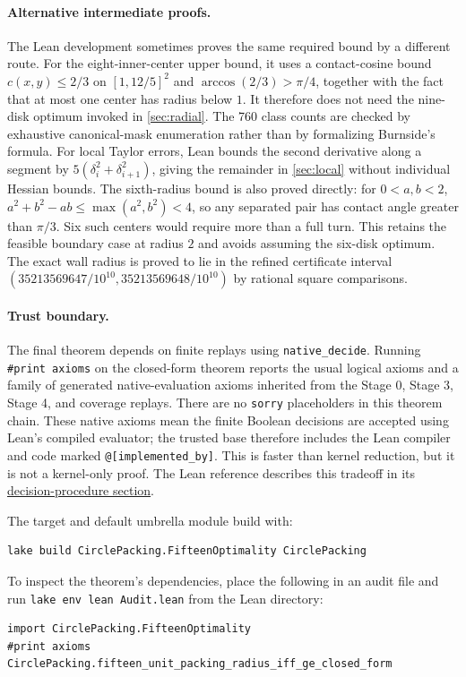 \documentclass[11pt]{article}
\theoremstyle{definition}
\begin{document}
\paragraph{Alternative intermediate proofs.}
The Lean development sometimes proves the same required bound by a different
route. For the eight-inner-center upper bound, it uses a contact-cosine bound
$c(x,y)\le2/3$ on $[1,12/5]^2$ and
$\arccos(2/3)>\pi/4$, together with the fact that at most one center has
radius below $1$. It therefore does not need the nine-disk optimum invoked
in \cref{sec:radial}. The 760 class counts are checked by exhaustive
canonical-mask enumeration rather than by formalizing Burnside's formula.
For local Taylor errors, Lean bounds the second derivative along a segment by
$5(\delta_i^2+\delta_{i+1}^2)$, giving the remainder in \cref{sec:local} without
individual Hessian bounds.
The sixth-radius bound is also proved directly: for $0<a,b<2$,
$a^2+b^2-ab\le\max(a^2,b^2)<4$, so any separated pair has contact angle
greater than $\pi/3$. Six such centers would require more than a full turn.
This retains the feasible boundary case at radius $2$ and avoids assuming
the six-disk optimum. The exact wall radius is proved to lie in the refined
certificate interval
$(35213569647/10^{10},35213569648/10^{10})$ by rational square comparisons.

\paragraph{Trust boundary.}
The final theorem depends on finite replays using \texttt{native\_decide}.
Running \texttt{\#print axioms} on the closed-form theorem reports the usual
logical axioms and a family of generated native-evaluation axioms inherited
from the Stage 0, Stage 3, Stage 4, and coverage replays. There are no
\texttt{sorry} placeholders in this theorem chain. These native axioms mean
the finite Boolean decisions are accepted using Lean's compiled evaluator;
the trusted base therefore includes the Lean compiler and code marked
\texttt{@[implemented\_by]}. This is faster than kernel reduction, but it is
not a kernel-only proof. The Lean reference describes this tradeoff in its
\href{https://lean-lang.org/doc/reference/latest/Tactic-Proofs/Tactic-Reference}{decision-procedure section}.

The target and default umbrella module build with:
\begin{verbatim}
lake build CirclePacking.FifteenOptimality CirclePacking
\end{verbatim}
To inspect the theorem's dependencies, place the following in an audit file
and run \texttt{lake env lean Audit.lean} from the Lean directory:
\begin{verbatim}
import CirclePacking.FifteenOptimality
#print axioms CirclePacking.fifteen_unit_packing_radius_iff_ge_closed_form
\end{verbatim}
\end{document}
